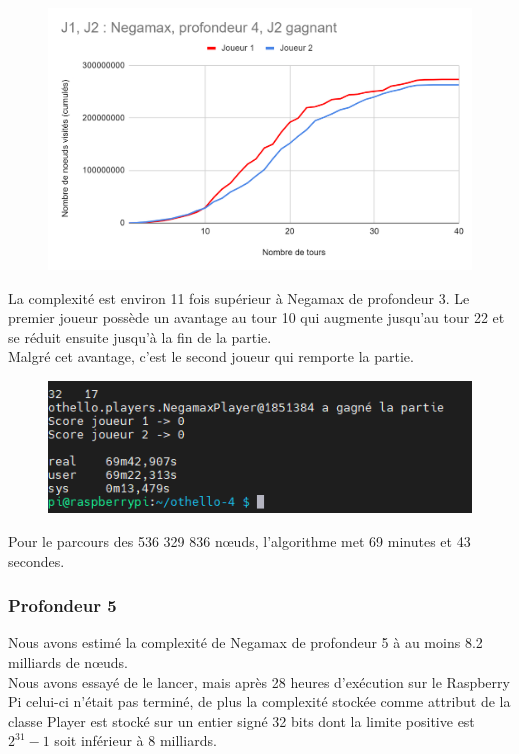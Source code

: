 \documentclass[12pt]{article}
\begin{document}
\begin{figure}[!h]
   \includegraphics[width=\textwidth]{prof4negamax.png}
\end{figure}

La complexité est environ 11 fois supérieur à Negamax de profondeur 3. Le premier joueur possède un avantage au tour 10 qui augmente jusqu’au tour 22 et se réduit ensuite jusqu’à la fin de la partie.\\
Malgré cet avantage, c’est le second joueur qui remporte la partie.

\begin{figure}[!h]
   \includegraphics[width=\textwidth]{prof4negamax-console.png}
\end{figure}

Pour le parcours des 536 329 836 nœuds, l’algorithme met 69 minutes et 43 secondes. 

\subsubsection{Profondeur 5}

Nous avons estimé la complexité de Negamax de profondeur 5 à au moins 8.2 milliards de nœuds.\\
Nous avons essayé de le lancer, mais après 28 heures d’exécution sur le Raspberry Pi celui-ci n’était pas terminé, de plus la complexité stockée comme attribut de la classe Player est stocké sur un entier signé 32 bits dont la limite positive est $2^{31} - 1$ soit inférieur à 8 milliards.
\end{document}
